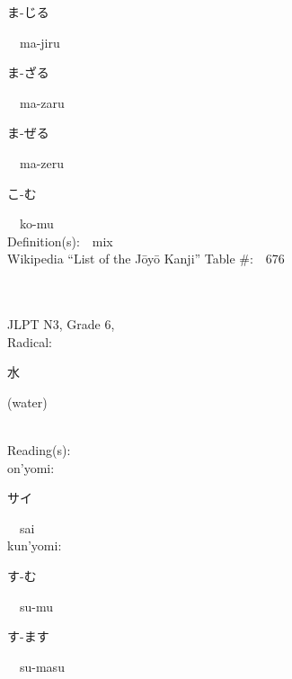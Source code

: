 \begin{multicols}{2}
{\hspace*{2em}}{\begin{CJK}{UTF8}{min} ま-じる \end{CJK}}\ \ ma-jiru\ \ \\
{\hspace*{2em}}{\begin{CJK}{UTF8}{min} ま-ざる \end{CJK}}\ \ ma-zaru\ \ \\
{\hspace*{2em}}{\begin{CJK}{UTF8}{min} ま-ぜる \end{CJK}}\ \ ma-zeru\ \ \\
{\hspace*{2em}}{\begin{CJK}{UTF8}{min} こ-む \end{CJK}}\ \ ko-mu\ \ \\
Definition(s):\ \ mix \\
Wikipedia ``List of the J\=oy\=o Kanji'' Table \#:\ \ 676 \\
\ \ \\
{\fontsize{34pt}{40pt}  }\ \ \\  %
{JLPT N3, Grade 6, \\Radical:\ \ {\begin{CJK}{UTF8}{min} 水 \end{CJK}} (water) } \\
Reading(s):\ \ \\
{\hspace*{1em}}on'yomi:\ \ \\
{\hspace*{2em}}{\begin{CJK}{UTF8}{min} サイ \end{CJK}}\ \ sai\ \ \\
{\hspace*{1em}}kun'yomi:\ \ \\
{\hspace*{2em}}{\begin{CJK}{UTF8}{min} す-む \end{CJK}}\ \ su-mu\ \ \\
{\hspace*{2em}}{\begin{CJK}{UTF8}{min} す-ます \end{CJK}}\ \ su-masu\ \ \\

\end{multicols}
